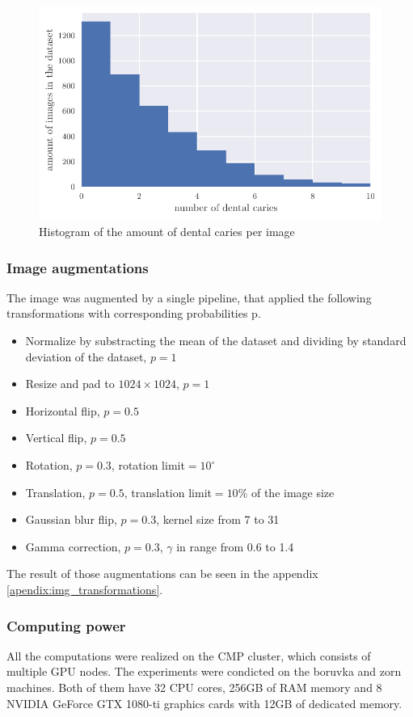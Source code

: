 \begin{figure}
    \includegraphics[width=\linewidth]{images/caries_histogram.pdf}
    \caption{Histogram of the amount of dental caries per image}
    \label{fig:hist_caries_per_img}
\end{figure}
\subsubsection{Image augmentations}
The image was augmented by a single pipeline, that applied the following transformations with corresponding probabilities p.
\begin{itemize}
    \item Normalize by substracting the mean of the dataset and dividing by standard deviation of the dataset, $p=1$
    \item Resize and pad to $1024\times1024$, $p=1$
    \item Horizontal flip, $p=0.5$
    \item Vertical flip, $p=0.5$
    \item Rotation, $p=0.3$, rotation limit$=10^{\circ}$
    \item Translation, $p=0.5$, translation limit$=10\%$ of the image size
    \item Gaussian blur flip, $p=0.3$, kernel size from 7 to 31
    \item Gamma correction, $p=0.3$, $\gamma$ in range from 0.6 to 1.4
\end{itemize}
The result of those augmentations can be seen in the appendix \ref{apendix:img_transformations}.
\subsubsection{Computing power}
All the computations were realized on the CMP cluster, which consists of multiple GPU nodes. The experiments were condicted on the boruvka and zorn machines. Both of them have 32 CPU cores, 256GB of RAM memory and 8 NVIDIA GeForce GTX 1080-ti graphics cards with 12GB of dedicated memory.

